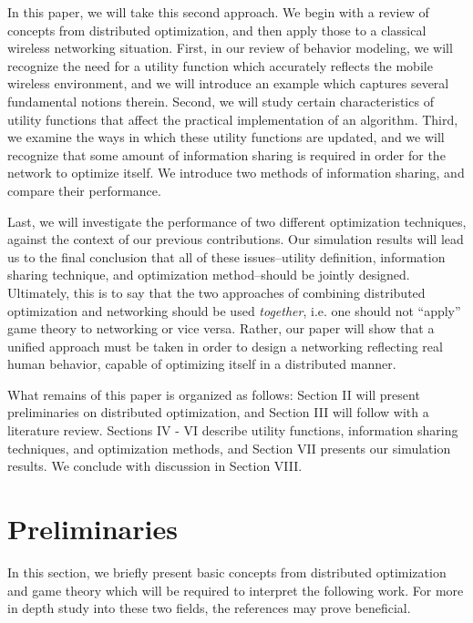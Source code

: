 \documentclass[11pt]{IEEEtran}
\theoremstyle{definition}
\begin{document}
In this paper, we will take this second approach.  We begin with a review of concepts from distributed optimization, and then apply those to a classical wireless networking situation. First, in our review of behavior modeling, we will recognize the need for a utility function which accurately reflects the mobile wireless environment, and we will introduce an example which captures several fundamental notions therein. Second, we will study certain characteristics of utility functions that affect the practical implementation of an algorithm. Third, we examine the ways in which these utility functions are updated, and we will recognize that some amount of information sharing is required in order for the network to optimize itself. We introduce two methods of information sharing, and compare their performance.

Last, we will investigate the performance of two different optimization techniques, against the context of our previous contributions.  Our
simulation results will lead us to the final conclusion that all of these issues--utility definition, information sharing technique, and optimization method--should be jointly designed.  Ultimately, this is to say that the two approaches of combining distributed optimization and networking should be used \emph{together}, i.e. one should not ``apply'' game theory to networking or vice versa.  Rather, our paper will show that a unified approach must be taken in order to design a networking reflecting real human behavior, capable of optimizing itself in a distributed manner.

What remains of this paper is organized as follows: Section II will present preliminaries on distributed optimization, and Section III will follow with a literature review.  Sections IV - VI describe utility functions, information sharing techniques, and optimization methods, and Section VII presents our simulation results.  We conclude with discussion in Section VIII.

\section{Preliminaries}

In this section, we briefly present basic concepts from distributed optimization and game theory which will be required to interpret the following work. For more in depth study into these two fields, the references \cite{BoydVan_book,OsborneRubinstein_book} may prove beneficial.
\end{document}
